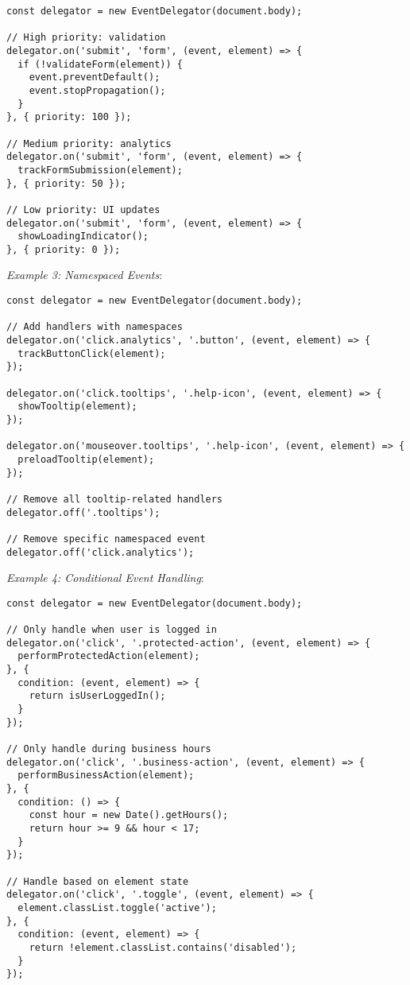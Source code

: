 \documentclass[11pt]{article}
\begin{document}
\begin{verbatim}
const delegator = new EventDelegator(document.body);

// High priority: validation
delegator.on('submit', 'form', (event, element) => {
  if (!validateForm(element)) {
    event.preventDefault();
    event.stopPropagation();
  }
}, { priority: 100 });

// Medium priority: analytics
delegator.on('submit', 'form', (event, element) => {
  trackFormSubmission(element);
}, { priority: 50 });

// Low priority: UI updates
delegator.on('submit', 'form', (event, element) => {
  showLoadingIndicator();
}, { priority: 0 });
\end{verbatim}

\emph{Example 3: Namespaced Events}:

\begin{verbatim}
const delegator = new EventDelegator(document.body);

// Add handlers with namespaces
delegator.on('click.analytics', '.button', (event, element) => {
  trackButtonClick(element);
});

delegator.on('click.tooltips', '.help-icon', (event, element) => {
  showTooltip(element);
});

delegator.on('mouseover.tooltips', '.help-icon', (event, element) => {
  preloadTooltip(element);
});

// Remove all tooltip-related handlers
delegator.off('.tooltips');

// Remove specific namespaced event
delegator.off('click.analytics');
\end{verbatim}

\emph{Example 4: Conditional Event Handling}:

\begin{verbatim}
const delegator = new EventDelegator(document.body);

// Only handle when user is logged in
delegator.on('click', '.protected-action', (event, element) => {
  performProtectedAction(element);
}, {
  condition: (event, element) => {
    return isUserLoggedIn();
  }
});

// Only handle during business hours
delegator.on('click', '.business-action', (event, element) => {
  performBusinessAction(element);
}, {
  condition: () => {
    const hour = new Date().getHours();
    return hour >= 9 && hour < 17;
  }
});

// Handle based on element state
delegator.on('click', '.toggle', (event, element) => {
  element.classList.toggle('active');
}, {
  condition: (event, element) => {
    return !element.classList.contains('disabled');
  }
});
\end{verbatim}
\end{document}
